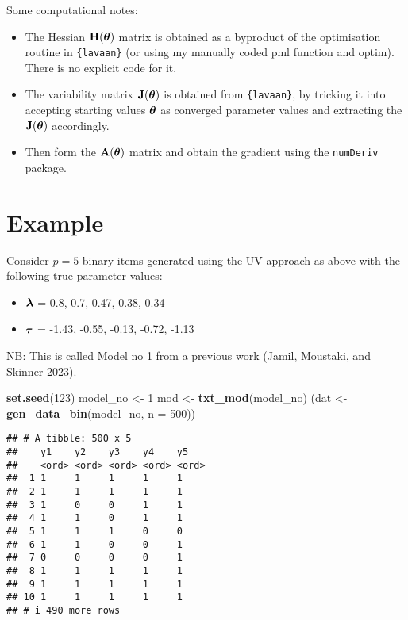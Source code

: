 \documentclass[
]{article}
\newenvironment{Shaded}{\begin{snugshade}}{\end{snugshade}}
\newcommand{\AttributeTok}[1]{\textcolor[rgb]{0.13,0.29,0.53}{#1}}
\newcommand{\DecValTok}[1]{\textcolor[rgb]{0.00,0.00,0.81}{#1}}
\newcommand{\FunctionTok}[1]{\textcolor[rgb]{0.13,0.29,0.53}{\textbf{#1}}}
\newcommand{\NormalTok}[1]{#1}
\newcommand{\OtherTok}[1]{\textcolor[rgb]{0.56,0.35,0.01}{#1}}
\providecommand{\tightlist}{%
  \setlength{\itemsep}{0pt}\setlength{\parskip}{0pt}}
\begin{document}
Some computational notes:

\begin{itemize}
\tightlist
\item
  The Hessian \({\mathbf H}({\boldsymbol\theta})\) matrix is obtained as a byproduct of the
  optimisation routine in \texttt{\{lavaan\}} (or using my manually
  coded pml function and optim). There is no explicit code for it.
\item
  The variability matrix \({\mathbf J}({\boldsymbol\theta})\) is obtained from
  \texttt{\{lavaan\}}, by tricking it into accepting starting values
  \({\boldsymbol\theta}\) as converged parameter values and extracting the
  \({\mathbf J}({\boldsymbol\theta})\) accordingly.
\item
  Then form the \({\mathbf A}({\boldsymbol\theta})\) matrix and obtain the gradient using
  the \texttt{numDeriv} package.
\end{itemize}

\section{Example}\label{example}

Consider \(p=5\) binary items generated using the UV approach as above
with the following true parameter values:

\begin{itemize}
\tightlist
\item
  \({\boldsymbol\lambda}\) = 0.8, 0.7, 0.47, 0.38, 0.34
\item
  \({\boldsymbol\tau}\) = -1.43, -0.55, -0.13, -0.72, -1.13
\end{itemize}

NB: This is called Model no 1 from a previous work (Jamil, Moustaki, and
Skinner 2023).

\begin{Shaded}
\begin{Highlighting}[]
\FunctionTok{set.seed}\NormalTok{(}\DecValTok{123}\NormalTok{)}
\NormalTok{model\_no }\OtherTok{\textless{}{-}} \DecValTok{1}
\NormalTok{mod }\OtherTok{\textless{}{-}} \FunctionTok{txt\_mod}\NormalTok{(model\_no)}
\NormalTok{(dat }\OtherTok{\textless{}{-}} \FunctionTok{gen\_data\_bin}\NormalTok{(model\_no, }\AttributeTok{n =} \DecValTok{500}\NormalTok{))}
\end{Highlighting}
\end{Shaded}

\begin{verbatim}
## # A tibble: 500 x 5
##    y1    y2    y3    y4    y5   
##    <ord> <ord> <ord> <ord> <ord>
##  1 1     1     1     1     1    
##  2 1     1     1     1     1    
##  3 1     0     0     1     1    
##  4 1     1     0     1     1    
##  5 1     1     1     0     0    
##  6 1     1     0     0     1    
##  7 0     0     0     0     1    
##  8 1     1     1     1     1    
##  9 1     1     1     1     1    
## 10 1     1     1     1     1    
## # i 490 more rows
\end{verbatim}
\end{document}
